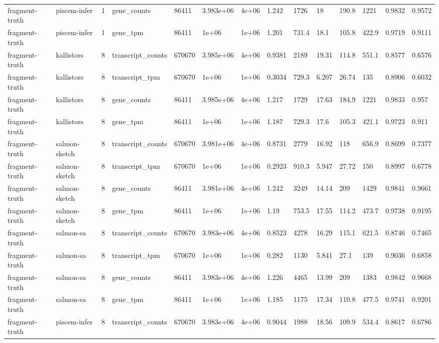 \begin{tabular}{llllllllllllll}
fragment-truth & piscem-infer & 1 & gene\_counts & 86411 & 3.983e+06 & 4e+06 & 1.242 & 1726 & 18 & 190.8 & 1221 & 0.9832 & 0.9572 \\
fragment-truth & piscem-infer & 1 & gene\_tpm & 86411 & 1e+06 & 1e+06 & 1.201 & 731.4 & 18.1 & 105.8 & 422.9 & 0.9719 & 0.9111 \\
fragment-truth & kallistors & 8 & transcript\_counts & 670670 & 3.985e+06 & 4e+06 & 0.9381 & 2189 & 19.31 & 114.8 & 551.1 & 0.8577 & 0.6576 \\
fragment-truth & kallistors & 8 & transcript\_tpm & 670670 & 1e+06 & 1e+06 & 0.3034 & 729.3 & 6.207 & 26.74 & 135 & 0.8906 & 0.6032 \\
fragment-truth & kallistors & 8 & gene\_counts & 86411 & 3.985e+06 & 4e+06 & 1.217 & 1729 & 17.63 & 184.9 & 1221 & 0.9833 & 0.957 \\
fragment-truth & kallistors & 8 & gene\_tpm & 86411 & 1e+06 & 1e+06 & 1.187 & 729.3 & 17.6 & 105.3 & 421.1 & 0.9723 & 0.911 \\
fragment-truth & salmon-sketch & 8 & transcript\_counts & 670670 & 3.981e+06 & 4e+06 & 0.8731 & 2779 & 16.92 & 118 & 656.9 & 0.8699 & 0.7377 \\
fragment-truth & salmon-sketch & 8 & transcript\_tpm & 670670 & 1e+06 & 1e+06 & 0.2923 & 910.3 & 5.947 & 27.72 & 150 & 0.8997 & 0.6778 \\
fragment-truth & salmon-sketch & 8 & gene\_counts & 86411 & 3.981e+06 & 4e+06 & 1.242 & 3249 & 14.14 & 209 & 1429 & 0.9841 & 0.9661 \\
fragment-truth & salmon-sketch & 8 & gene\_tpm & 86411 & 1e+06 & 1e+06 & 1.19 & 753.5 & 17.55 & 114.2 & 473.7 & 0.9738 & 0.9195 \\
fragment-truth & salmon-sa & 8 & transcript\_counts & 670670 & 3.983e+06 & 4e+06 & 0.8523 & 4278 & 16.29 & 115.1 & 621.5 & 0.8746 & 0.7465 \\
fragment-truth & salmon-sa & 8 & transcript\_tpm & 670670 & 1e+06 & 1e+06 & 0.282 & 1130 & 5.841 & 27.1 & 139 & 0.9036 & 0.6858 \\
fragment-truth & salmon-sa & 8 & gene\_counts & 86411 & 3.983e+06 & 4e+06 & 1.226 & 4465 & 13.99 & 209 & 1383 & 0.9842 & 0.9668 \\
fragment-truth & salmon-sa & 8 & gene\_tpm & 86411 & 1e+06 & 1e+06 & 1.185 & 1175 & 17.34 & 110.8 & 477.5 & 0.9741 & 0.9201 \\
fragment-truth & piscem-infer & 8 & transcript\_counts & 670670 & 3.983e+06 & 4e+06 & 0.9044 & 1988 & 18.56 & 109.9 & 534.4 & 0.8617 & 0.6786 \\

\end{tabular}
